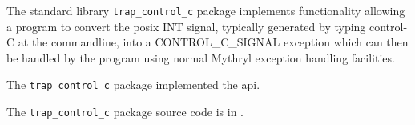 
The standard library {\tt trap\_control\_c} package implements functionality allowing 
a program to convert the posix {\sc INT} signal, typically generated by typing 
control-C at the commandline, into a {\sc CONTROL\_C\_SIGNAL} exception which can then be 
handled by the program using normal Mythryl exception handling facilities.

The {\tt trap\_control\_c} package implemented the  api.

The {\tt trap\_control\_c} package source code is in .

